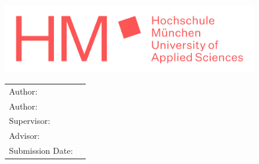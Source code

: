 \begin{titlepage}
	\centering
	
	\includegraphics[height=30mm]{image/HM/logo_text.png}
	
	\doublespacing
	{\huge\MakeUppercase{\getFaculty{}}}
	
	\singlespacing
	\vspace{5mm}
	{\large\MakeUppercase{\getUniversity{}}}
	
	\vspace{20mm}
	{\Large \getDoctype{}}
	
	\vspace{15mm}
	{\huge\bfseries \getTitle{}}
	
	\vspace{15mm}
	{\huge\bfseries \getTitleDesc{}}
	
	\vfill{}
	\begin{tabular}{l l} %
		Author:          & \getAuthorA \\
		Author:          & \getAuthorA \\
		Supervisor:      & \getSupervisor{} \\
		Advisor:         & \getAdvisor{} \\
		Submission Date: & \getSubmissionDate{} \\
	\end{tabular}
	
\end{titlepage}

